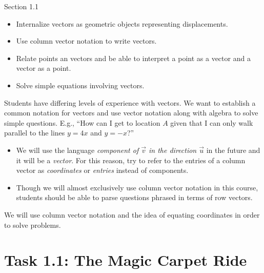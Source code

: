 \documentclass{problemset}
\begin{document}
\begin{lesson}

	 Section 1.1

	\begin{itemize}
		\item Internalize vectors as geometric objects representing displacements.

		\item Use column vector notation to write vectors.

		\item Relate points an vectors and be able to interpret a point as
			a vector and a vector as a point.

		\item Solve simple equations involving vectors.
	\end{itemize}

	 Students have differing levels of experience with vectors.
	We want to establish a common notation for vectors and use vector notation
	along with algebra to solve simple questions. E.g., ``How can I get to location
	$A$ given that I can only walk parallel to the lines $y=4x$ and $y=-x$?''


	\begin{annotation}
		\begin{notes}
			\begin{itemize}
			\item
			We will use the language \emph{component of $\vec v$ in
			the direction $\vec u$} in the future and it will be a \emph{vector}.
			For this reason, try to refer to the entries of a column
			vector as \emph{coordinates} or \emph{entries} instead of components.
			
			\item
			Though we will almost exclusively use
			column vector notation in this course, students should be able to parse
			questions phrased in terms of row vectors.
			\end{itemize}
		\end{notes}
	\end{annotation}We will use column vector notation and the idea of equating
	coordinates in order to solve problems. 

	\newpage
\end{lesson}

\setcounter{page}{1}
\pagestyle{iola}
\section*{Task 1.1: The Magic Carpet Ride}
\end{document}
